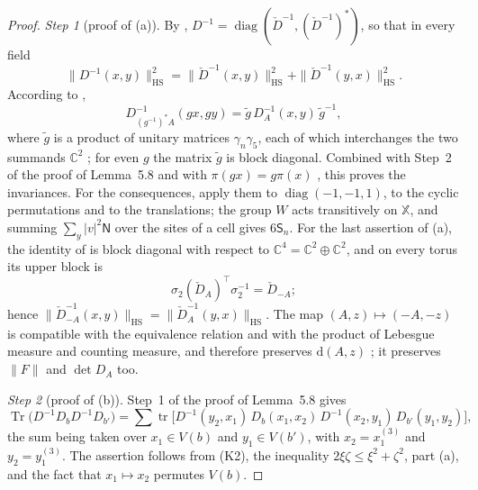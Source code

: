 \documentclass[11pt,letterpaper,reqno]{amsart}
\theoremstyle{definition}
\begin{document}
\begin{proof}
\emph{Step 1} (proof of (a)).
By \cite[Proposition~3.18\,(d)]{QEDII}, $D^{-1}=\operatorname{diag}(\check D^{-1},(\check D^{-1})^*)$, so that in every field
\begin{equation*}
\|D^{-1}(x,y)\|^2_{\mathrm{HS}}=\|\check D^{-1}(x,y)\|^2_{\mathrm{HS}}+\|\check D^{-1}(y,x)\|^2_{\mathrm{HS}}.
\end{equation*}
According to \cite[Proposition~3.16\,(b)]{QEDII},
\begin{equation*}
D^{-1}_{(g^{-1})^*A}(gx,gy)=\tilde g\,D_A^{-1}(x,y)\,\tilde g^{-1},
\end{equation*}
where $\tilde g$ is a product of unitary matrices $\gamma_n\gamma_5$, each of which interchanges the two summands $\mathbb C^2$ \cite[Definition~2.7]{QEDII}; for even $g$ the matrix $\tilde g$ is block diagonal.
Combined with Step~2 of the proof of Lemma~5.8 and with $\pi(gx)=g\pi(x)$ \cite[Proposition~3.6\,(c)]{QEDII}, this proves the invariances.
For the consequences, apply them to $\operatorname{diag}(-1,-1,1)$, to the cyclic permutations and to the translations; the group $W$ acts transitively on $\mathbb X$, and summing $\sum_y|v|^2\mathsf N$ over the sites of a cell gives $6\mathsf S_n$.
For the last assertion of (a), the identity of \cite[Proposition~3.16\,(c)]{QEDII} is block diagonal with respect to $\mathbb C^4=\mathbb C^2\oplus\mathbb C^2$, and on every torus its upper block is
\begin{equation*}
\sigma_2(\check D_A)^{\top}\sigma_2^{-1}=\check D_{-A};
\end{equation*}
hence $\|\check D_{-A}^{-1}(x,\allowbreak y)\|_{\mathrm{HS}}=\allowbreak \|\check D_A^{-1}(y,\allowbreak x)\|_{\mathrm{HS}}$.
The map $(A,z)\mapsto(-A,-z)$ is compatible with the equivalence relation and with the product of Lebesgue measure and counting measure, and therefore preserves $\mathrm d(A,z)$ \cite[Definition~2.6]{QEDII}; it preserves $\|F\|$ and $\det D_A$ too.

\emph{Step 2} (proof of (b)).
Step~1 of the proof of Lemma~5.8 gives
\begin{equation*}
\operatorname{Tr}\bigl(D^{-1}D_bD^{-1}D_{b'}\bigr)=\sum\operatorname{tr}\bigl[D^{-1}(y_2,x_1)\,D_b(x_1,x_2)\,D^{-1}(x_2,y_1)\,D_{b'}(y_1,y_2)\bigr],
\end{equation*}
the sum being taken over $x_1\in V(b)$ and $y_1\in V(b')$, with $x_2=x_1^{(3)}$ and $y_2=y_1^{(3)}$.
The assertion follows from (K2), the inequality $2\xi\zeta\le\xi^2+\zeta^2$, part (a), and the fact that $x_1\mapsto x_2$ permutes $V(b)$.


\end{proof}
\end{document}
